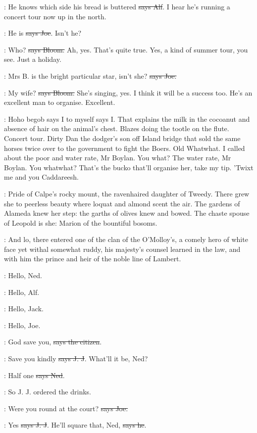 \bergan:
He knows which side his bread is buttered \sout{says Alf}.
I hear he's running
a concert tour now up in the north.

\joe:
He is \sout{says Joe}. Isn't he?

\Bloom:
Who? \sout{says Bloom.}
Ah, yes. That's quite true. Yes, a kind of summer tour,
you see. Just a holiday.

\joe:
Mrs B. is the bright particular star,
isn't she? \sout{says Joe.}

\Bloom:
My wife? \sout{says Bloom.} She's singing, yes.
I think it will be a success too.
He's an excellent man to organise. Excellent.

\Nq:
Hoho begob says I to myself says I. That explains the milk in the cocoanut
and absence of hair on the animal's chest. Blazes doing the tootle on the
flute. Concert tour. Dirty Dan the dodger's son off Island bridge that
sold the same horses twice over to the government to fight the Boers. Old
Whatwhat. I called about the poor and water rate, Mr Boylan. You what?
The water rate, Mr Boylan. You whatwhat? That's the bucko that'll
organise her, take my tip. 'Twixt me and you Caddareesh.

:
Pride of Calpe's rocky mount, the ravenhaired daughter of Tweedy.
There grew she to peerless beauty where loquat and almond scent the air.
The gardens of Alameda knew her step: the garths of olives knew and
bowed. The chaste spouse of Leopold is she: Marion of the bountiful
bosoms.

:
And lo, there entered one of the clan of the O'Molloy's, a comely hero
of white face yet withal somewhat ruddy, his majesty's counsel learned in
the law, and with him the prince and heir of the noble line of Lambert.

\bergan:
Hello, Ned.

\lambert:
Hello, Alf.

\joe:
Hello, Jack.

\jjom:
Hello, Joe.

\citizen:
God save you, \sout{says the citizen}.

\jjom:
Save you kindly \sout{says J. J}.
What'll it be, Ned?

\lambert:
Half one \sout{says Ned}.

\Nq:
So J. J. ordered the drinks.

\joe:
Were you round at the court? \sout{says Joe.}

\jjom:
Yes \sout{says J. J}.
He'll square that, Ned, \sout{says he}.

